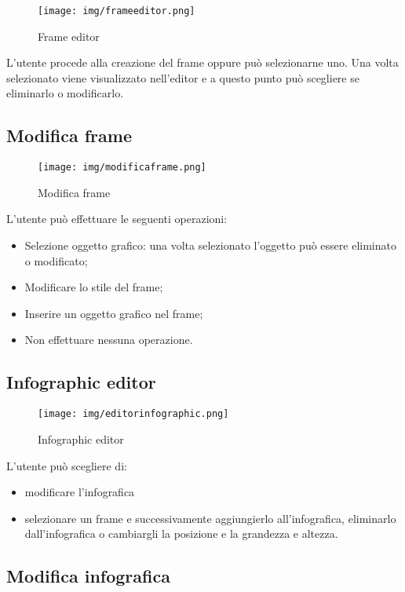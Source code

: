 \begin{figure}[h!]
		\centering
		\texttt{[image: img/frameeditor.png]}
		\caption{Frame editor}
		\label{fig:ModelloSpy}
\end{figure}

L'utente procede alla creazione del frame oppure può selezionarne uno. Una volta selezionato viene visualizzato nell'editor e a questo punto può scegliere se eliminarlo o modificarlo.

\subsection{Modifica frame}

\begin{figure}[h!]
		\centering
		\texttt{[image: img/modificaframe.png]}
		\caption{Modifica frame}
		\label{fig:ModelloSpy}
\end{figure}

L'utente può effettuare le seguenti operazioni:
\begin{itemize}
\item Selezione oggetto grafico: una volta selezionato l'oggetto può essere eliminato o modificato;
\item Modificare lo stile del frame;
\item Inserire un oggetto grafico nel frame;
\item Non effettuare nessuna operazione.
\end{itemize}

\subsection{Infographic editor}

\begin{figure}[h!]
		\centering
		\texttt{[image: img/editorinfographic.png]}
		\caption{Infographic editor}
		\label{fig:ModelloSpy}
\end{figure}

L'utente può scegliere di: 
\begin{itemize}
\item modificare l'infografica 
\item selezionare un frame e successivamente aggiungierlo all'infografica, eliminarlo dall'infografica o cambiargli la posizione e la grandezza e altezza.
\end{itemize}

\subsection{Modifica infografica}

